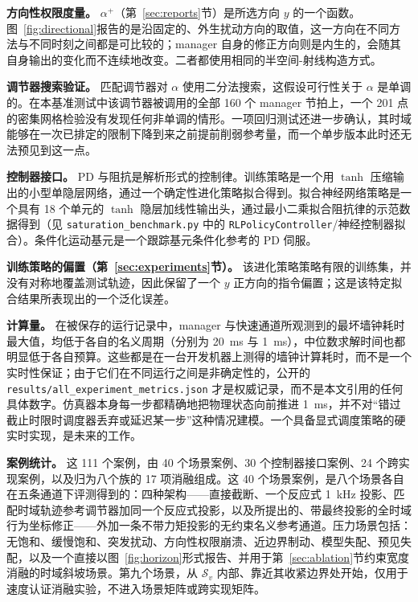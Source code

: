 \documentclass[journal]{IEEEtran}
\begin{document}
\textbf{方向性权限度量。} $\alpha^+$（第~\ref{sec:reports}节）是所选方向 $y$ 的一个函数。图~\ref{fig:directional}报告的是沿固定的、外生扰动方向的取值，这一方向在不同方法与不同时刻之间都是可比较的；manager 自身的修正方向则是内生的，会随其自身输出的变化而不连续地改变。二者都使用相同的半空间-射线构造方式。

\textbf{调节器搜索验证。} 匹配调节器对 $\alpha$ 使用二分法搜索，这假设可行性关于 $\alpha$ 是单调的。在本基准测试中该调节器被调用的全部 160 个 manager 节拍上，一个 201 点的密集网格检验没有发现任何非单调的情形。一项回归测试还进一步确认，其时域能够在一次已排定的限制下降到来之前提前削弱参考量，而一个单步版本此时还无法预见到这一点。

\textbf{控制器接口。} PD 与阻抗是解析形式的控制律。训练策略是一个用 $\tanh$ 压缩输出的小型单隐层网络，通过一个确定性进化策略拟合得到。拟合神经网络策略是一个具有 18 个单元的 $\tanh$ 隐层加线性输出头，通过最小二乘拟合阻抗律的示范数据得到（见 \texttt{saturation\_benchmark.py} 中的 \texttt{RLPolicyController}/神经控制器拟合）。条件化运动基元是一个跟踪基元条件化参考的 PD 伺服。

\textbf{训练策略的偏置（第~\ref{sec:experiments}节）。} 该进化策略策略有限的训练集，并没有对称地覆盖测试轨迹，因此保留了一个 $y$ 正方向的指令偏置；这是该特定拟合结果所表现出的一个泛化误差。

\textbf{计算量。} 在被保存的运行记录中，manager 与快速通道所观测到的最坏墙钟耗时最大值，均低于各自的名义周期（分别为 20~ms 与 1~ms），中位数求解时间也都明显低于各自预算。这些都是在一台开发机器上测得的墙钟计算耗时，而不是一个实时性保证；由于它们在不同运行之间是非确定性的，公开的 \texttt{results/all\_experiment\_metrics.json} 才是权威记录，而不是本文引用的任何具体数字。仿真器本身每一步都精确地把物理状态向前推进 1~ms，并不对“错过截止时限时调度器丢弃或延迟某一步”这种情况建模。一个具备显式调度策略的硬实时实现，是未来的工作。

\textbf{案例统计。} 这 111 个案例，由 40 个场景案例、30 个控制器接口案例、24 个跨实现案例，以及归为八个族的 17 项消融组成。这 40 个场景案例，是八个场景各自在五条通道下评测得到的：四种架构——直接截断、一个反应式 1~kHz 投影、匹配时域轨迹参考调节器加同一个反应式投影，以及所提出的、带最终投影的全时域行为坐标修正——外加一条不带力矩投影的无约束名义参考通道。压力场景包括：无饱和、缓慢饱和、突发扰动、方向性权限崩溃、近边界制动、模型失配、预见失配，以及一个直接以图~\ref{fig:horizon}形式报告、并用于第~\ref{sec:ablation}节约束宽度消融的时域斜坡场景。第九个场景，从 $\mathcal S_v$ 内部、靠近其收紧边界处开始，仅用于速度认证消融实验，不进入场景矩阵或跨实现矩阵。
\end{document}
